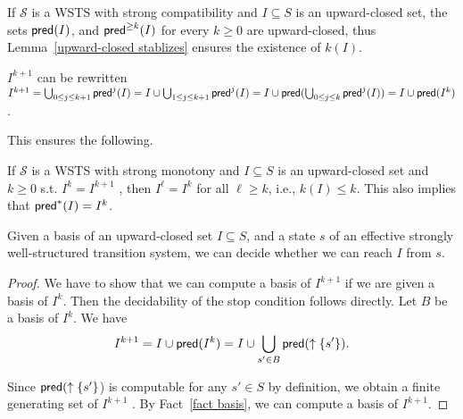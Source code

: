 If $\mathscr{S}$ is a WSTS with strong compatibility and $I \subseteq S$ is an upward-closed set, the sets $\textsf{pred}(I )$, and $\textsf{pred}^{\geq k}(I )$ for
every $k \geq 0$ are upward-closed, thus Lemma~\ref{upward-closed stablizes} ensures the existence of $k(I)$.

\begin{remark}
$I^{k+1} $ can be rewritten $I^{k+1}= \bigcup_{0 \leq j \leq k+1} \pred^j(I) = 
I \cup \bigcup_{1 \leq j \leq k+1} \pred^j(I) =
I \cup \pred(\bigcup_{0 \leq j \leq k} \pred^j(I))
=  I \cup \pred(I^k)$.
\end{remark}

This ensures the following.

\begin{fact}\label{stop condition}
If $\mathscr{S}$ is a WSTS with strong monotony and $I \subseteq S$ is an upward-closed set and $k \geq 0$ s.t. $I^k = I^{k+1}$ , then $I^\ell = I^k$ for all $\ell \geq k$, i.e.,
$k(I) \leq k$. This also implies that $\textsf{pred}^*(I) = I^k$.
\end{fact}

\iffalse
\begin{remark}
$I^{k+1} = \bigcup_{0 \leq j \leq k+1} \pred^j(I) = 
I \cup \bigcup_{1 \leq j \leq k+1} \pred^j(I) =
I \cup \pred(\bigcup_{0 \leq j \leq k} \pred^j(I))
=  I \cup \pred(I^k)$.
\end{remark}
\fi

\begin{lemma}
 Given a basis of an upward-closed set $I \subseteq S$, and a state $s$ of an effective strongly well-structured transition
system, we can decide whether we can reach $I$ from $s$.
\end{lemma}

\begin{proof}
We have to show that we can compute a basis of $I^{k+1}$ if we are given a basis of $I^k $. 
Then the
decidability of the stop condition follows directly. Let $B$ be a basis of $I^k$. 
We have
$$I^{k+1} = I \cup \textsf{pred}(I^k ) = I \cup
\bigcup_{s' \in B}
\textsf{pred}(\uparrow \{s' \}).$$

Since $\textsf{pred}(\uparrow \{s' \}$) is computable for any $s'\in S$ by definition, we obtain a finite generating set of $I^{k+1}$ . By
Fact~\ref{fact basis}, we can compute a basis of $I^{k+1}$.
\end{proof}

